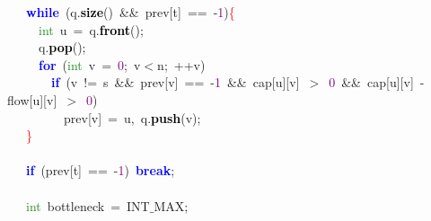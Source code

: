 {{\mbox{}\ \ \ \ \textbf{\textcolor{Blue}{while}}\ \textcolor{BrickRed}{(}q\textcolor{BrickRed}{.}\textbf{\textcolor{Black}{size}}\textcolor{BrickRed}{()}\ \textcolor{BrickRed}{\&\&}\ prev\textcolor{BrickRed}{[}t\textcolor{BrickRed}{]}\ \textcolor{BrickRed}{==}\ \textcolor{BrickRed}{-}\textcolor{Purple}{1}\textcolor{BrickRed}{)}\textcolor{Red}{\{} \\
\mbox{}\ \ \ \ \ \ \textcolor{ForestGreen}{int}\ u\ \textcolor{BrickRed}{=}\ q\textcolor{BrickRed}{.}\textbf{\textcolor{Black}{front}}\textcolor{BrickRed}{();} \\
\mbox{}\ \ \ \ \ \ q\textcolor{BrickRed}{.}\textbf{\textcolor{Black}{pop}}\textcolor{BrickRed}{();} \\
\mbox{}\ \ \ \ \ \ \textbf{\textcolor{Blue}{for}}\ \textcolor{BrickRed}{(}\textcolor{ForestGreen}{int}\ v\ \textcolor{BrickRed}{=}\ \textcolor{Purple}{0}\textcolor{BrickRed}{;}\ v\textcolor{BrickRed}{$<$}n\textcolor{BrickRed}{;}\ \textcolor{BrickRed}{++}v\textcolor{BrickRed}{)} \\
\mbox{}\ \ \ \ \ \ \ \ \textbf{\textcolor{Blue}{if}}\ \textcolor{BrickRed}{(}v\ \textcolor{BrickRed}{!=}\ s\ \textcolor{BrickRed}{\&\&}\ prev\textcolor{BrickRed}{[}v\textcolor{BrickRed}{]}\ \textcolor{BrickRed}{==}\ \textcolor{BrickRed}{-}\textcolor{Purple}{1}\ \textcolor{BrickRed}{\&\&}\ cap\textcolor{BrickRed}{[}u\textcolor{BrickRed}{][}v\textcolor{BrickRed}{]}\ \textcolor{BrickRed}{$>$}\ \textcolor{Purple}{0}\ \textcolor{BrickRed}{\&\&}\ cap\textcolor{BrickRed}{[}u\textcolor{BrickRed}{][}v\textcolor{BrickRed}{]}\ \textcolor{BrickRed}{-}\ flow\textcolor{BrickRed}{[}u\textcolor{BrickRed}{][}v\textcolor{BrickRed}{]}\ \textcolor{BrickRed}{$>$}\ \textcolor{Purple}{0}\textcolor{BrickRed}{)} \\
\mbox{}\ \ \ \ \ \ \ \ \ \ prev\textcolor{BrickRed}{[}v\textcolor{BrickRed}{]}\ \textcolor{BrickRed}{=}\ u\textcolor{BrickRed}{,}\ q\textcolor{BrickRed}{.}\textbf{\textcolor{Black}{push}}\textcolor{BrickRed}{(}v\textcolor{BrickRed}{);} \\
\mbox{}\ \ \ \ \textcolor{Red}{\}} \\
\mbox{} \\
\mbox{}\ \ \ \ \textbf{\textcolor{Blue}{if}}\ \textcolor{BrickRed}{(}prev\textcolor{BrickRed}{[}t\textcolor{BrickRed}{]}\ \textcolor{BrickRed}{==}\ \textcolor{BrickRed}{-}\textcolor{Purple}{1}\textcolor{BrickRed}{)}\ \textbf{\textcolor{Blue}{break}}\textcolor{BrickRed}{;} \\
\mbox{} \\
\mbox{}\ \ \ \ \textcolor{ForestGreen}{int}\ bottleneck\ \textcolor{BrickRed}{=}\ INT$\_$MAX\textcolor{BrickRed}{;} \\
}}
